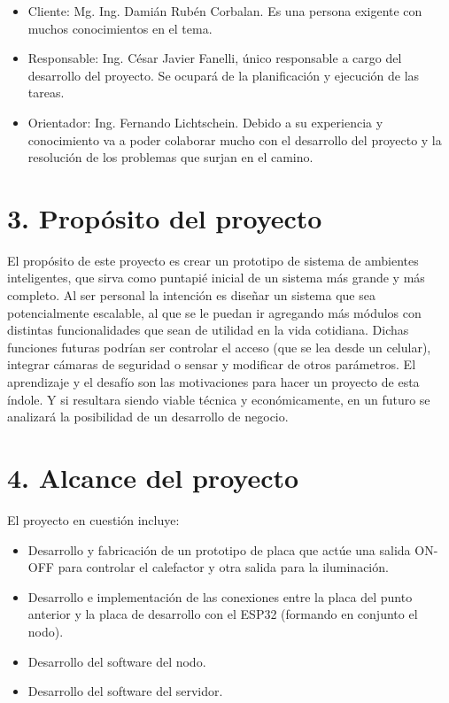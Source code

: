\documentclass[
11pt, %
]{charter}
\begin{document}
\begin{itemize}
	\item Cliente: Mg. Ing. Damián Rubén Corbalan. Es una persona exigente con muchos conocimientos en el tema.
	\item Responsable: Ing. César Javier Fanelli, único responsable a cargo del desarrollo del proyecto. Se ocupará de la planificación y ejecución de las tareas.
	\item Orientador: Ing. Fernando Lichtschein. Debido a su experiencia y conocimiento va a poder colaborar mucho con el desarrollo del proyecto y la resolución de los problemas que surjan en el camino.
\end{itemize}

\section{3. Propósito del proyecto}
\label{sec:proposito}

El propósito de este proyecto es crear un prototipo de sistema de ambientes inteligentes, que sirva como puntapié inicial de un sistema más grande y más completo. Al ser personal la intención es diseñar un sistema que sea potencialmente escalable, al que se le puedan ir agregando más módulos con distintas funcionalidades que sean de utilidad en la vida cotidiana. Dichas funciones futuras podrían ser controlar el acceso (que se lea desde un celular), integrar cámaras de seguridad o sensar y modificar de otros parámetros. El aprendizaje y el desafío son las motivaciones para hacer un proyecto de esta índole. Y si resultara siendo viable técnica y económicamente, en un futuro se analizará la posibilidad de un desarrollo de negocio.

\section{4. Alcance del proyecto}
\label{sec:alcance}

El proyecto en cuestión incluye:
\begin{itemize}
	\item Desarrollo y fabricación de un prototipo de placa que actúe una salida ON-OFF para controlar el calefactor y otra salida para la iluminación.
	\item Desarrollo e implementación de las conexiones entre la placa del punto anterior y la placa de desarrollo con el ESP32 (formando en conjunto el nodo).
	\item Desarrollo del software del nodo.
	\item Desarrollo del software del servidor.
\end{itemize}
\end{document}
